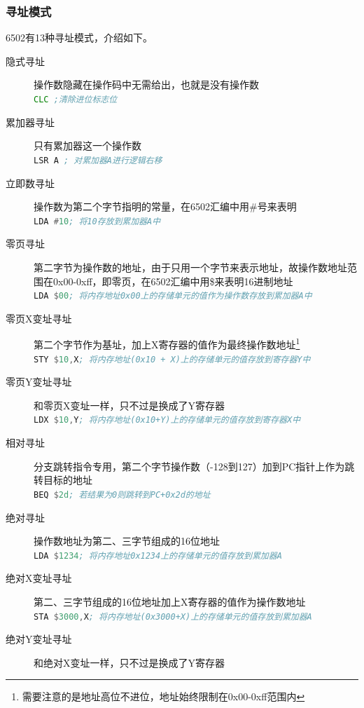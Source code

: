\documentclass[a4paper]{ltxdoc}
\begin{document}
{\subsubsection{寻址模式}
6502有13种寻址模式，介绍如下。
\begin{description}
\item [隐式寻址] 操作数隐藏在操作码中无需给出，也就是没有操作数\\
 \mintinline [breaklines]{asm}{CLC ;清除进位标志位}
\item [累加器寻址] 只有累加器这一个操作数\\
 \mintinline [breaklines]{asm}{LSR A ; 对累加器A进行逻辑右移}
\item [立即数寻址] 操作数为第二个字节指明的常量，在6502汇编中用\#号来表明\\
 \mintinline [breaklines]{asm}{LDA #10; 将10存放到累加器A中}
\item [零页寻址] 第二字节为操作数的地址，由于只用一个字节来表示地址，故操作数地址范围在0x00-0xff，即零页，在6502汇编中用\$来表明16进制地址\\
 \mintinline [breaklines]{asm}{LDA $00; 将内存地址0x00上的存储单元的值作为操作数存放到累加器A中}
\item [零页X变址寻址] 第二个字节作为基址，加上X寄存器的值作为最终操作数地址\footnote{需要注意的是地址高位不进位，地址始终限制在0x00-0xff范围内}\\
 \mintinline [breaklines]{asm}{STY $10,X; 将内存地址(0x10 + X)上的存储单元的值存放到寄存器Y中}
\item [零页Y变址寻址] 和零页X变址一样，只不过是换成了Y寄存器\\
 \mintinline [breaklines]{asm}{LDX $10,Y; 将内存地址(0x10+Y)上的存储单元的值存放到寄存器X中}
\item [相对寻址] 分支跳转指令专用，第二个字节操作数（-128到127）加到PC指针上作为跳转目标的地址\\
 \mintinline [breaklines]{asm}{BEQ $2d; 若结果为0则跳转到PC+0x2d的地址}
\item [绝对寻址] 操作数地址为第二、三字节组成的16位地址\\
 \mintinline [breaklines]{asm}{LDA $1234; 将内存地址0x1234上的存储单元的值存放到累加器A}
\item [绝对X变址寻址] 第二、三字节组成的16位地址加上X寄存器的值作为操作数地址\\
 \mintinline [breaklines]{asm}{STA $3000,X; 将内存地址(0x3000+X)上的存储单元的值存放到累加器A}
\item [绝对Y变址寻址] 和绝对X变址一样，只不过是换成了Y寄存器\\

\end{description}}
\end{document}
